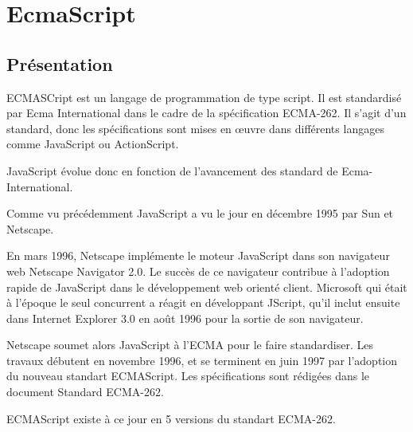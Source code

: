 \section{EcmaScript}
\label{ch:ecmascript}

\subsection{Présentation}

ECMASCript est un langage de programmation de type script. Il est standardisé par Ecma International dans le cadre de la spécification ECMA-262. Il s’agit d’un standard, donc les spécifications sont mises en œuvre dans différents langages comme JavaScript ou ActionScript.

JavaScript évolue donc en fonction de l'avancement des standard de Ecma-International.

Comme vu précédemment JavaScript a vu le jour en décembre 1995 par Sun et Netscape.

En mars 1996, Netscape implémente le moteur JavaScript dans son navigateur web Netscape Navigator 2.0. Le succès de ce navigateur contribue à l’adoption rapide de JavaScript dans le développement web orienté client. Microsoft qui était à l’époque le seul concurrent a réagit en développant JScript, qu’il inclut ensuite dans Internet Explorer 3.0 en août 1996 pour la sortie de son navigateur.

Netscape soumet alors JavaScript à l’ECMA pour le faire standardiser. Les travaux débutent en novembre 1996, et se terminent en juin 1997 par l’adoption du nouveau standart ECMAScript. Les spécifications sont rédigées dans le document Standard ECMA-262.

ECMAScript existe à ce jour en 5 versions du standart ECMA-262.